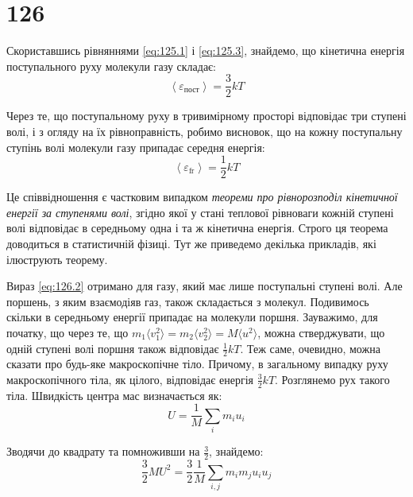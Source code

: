 \section{126}



Скориставшись рівняннями \eqref{eq:125.1} і \eqref{eq:125.3}, знайдемо, що кінетична енергія
поступального руху молекули газу складає:
\begin{equation}
    \left\langle \varepsilon_{\text{пост}} \right\rangle = \frac{3}{2}kT
    \label{eq:126.1}
\end{equation}

Через те, що поступальному руху в тривимірному просторі відповідає три ступені волі, і з огляду на їх
рівноправність, робимо висновок, що на кожну поступальну ступінь волі молекули газу припадає середня
енергія:
\begin{equation}
    \left\langle \varepsilon_{\text{fr}} \right\rangle = \frac{1}{2}kT
    \label{eq:126.2}
\end{equation}

Це співвідношення є частковим випадком \textit{теореми про рівнорозподіл кінетичної енергії за
ступенями волі}, згідно якої у стані теплової рівноваги кожній ступені волі відповідає в середньому
одна і та ж кінетична енергія. Строго ця теорема доводиться в статистичній фізиці. Тут же приведемо
декілька прикладів, які ілюструють теорему.

Вираз \eqref{eq:126.2} отримано для газу, який має лише поступальні ступені волі. Але поршень, з яким
взаємодіяв газ, також складається з молекул. Подивимось скільки в середньому енергії припадає на
молекули поршня. Зауважимо, для початку, що через те, що $m_{1}\langle v_{1}^{2} \rangle =
m_{2}\langle v_{2}^{2} \rangle = M\langle u^{2} \rangle$, можна стверджувати, що одній ступені волі
поршня також відповідає $\frac{1}{2}kT$. Теж саме, очевидно, можна сказати про будь-яке макроскопічне
тіло. Причому, в загальному випадку руху макроскопічного тіла, як цілого, відповідає енергія
$\frac{3}{2}kT$. Розглянемо рух такого тіла. Швидкість центра мас визначається як:
\begin{equation}
    U = \frac{1}{M}\sum_{i} m_{i}u_{i}
    \label{eq:126.3}
\end{equation}

Зводячи до квадрату та помноживши на $\frac{3}{2}$, знайдемо:
\begin{equation}
    \frac{3}{2}MU^{2} = \frac{3}{2}\frac{1}{M}\sum_{i,j} m_{i}m_{j}u_{i}u_{j}
    \label{eq:126.4}
\end{equation}

